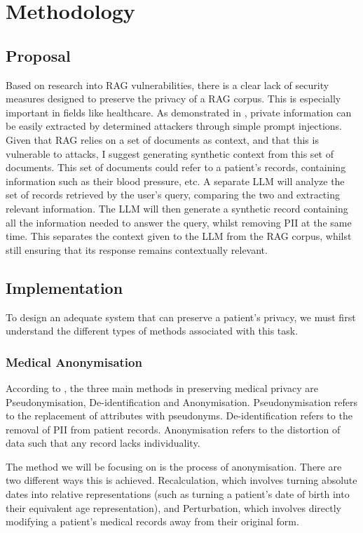 \chapter{Methodology}
\section{Proposal}
Based on research into RAG vulnerabilities, there is a clear lack of security measures designed to preserve the privacy of a RAG corpus. This is especially important in fields like healthcare.
As demonstrated in \autocite{zeng2024goodbadexploringprivacy}, private information can be easily extracted by determined attackers through simple prompt injections.
Given that RAG relies on a set of documents as context, and that this is vulnerable to attacks, I suggest generating synthetic context from this set of documents.
This set of documents could refer to a patient's records, containing information such as their blood pressure, etc.
A separate LLM will analyze the set of records retrieved by the user's query, comparing the two and extracting relevant information.
The LLM will then generate a synthetic record containing all the information needed to answer the query, whilst removing PII at the same time.
This separates the context given to the LLM from the RAG corpus, whilst still ensuring that its response remains contextually relevant.

\section {Implementation}
To design an adequate system that can preserve a patient's privacy, we must first understand the different types of methods associated with this task.

\subsection{Medical Anonymisation}
According to \autocite{Rodriguez_Tuck_Dozier_Lewis_Eldridge_Jackson_Murray_Weir_2022}, the three main methods in preserving medical privacy are Pseudonymisation, De-identification and Anonymisation.
Pseudonymisation refers to the replacement of attributes with pseudonyms. De-identification refers to the removal of PII from patient records.
Anonymisation refers to the distortion of data such that any record lacks individuality.

The method we will be focusing on is the process of anonymisation.
There are two different ways this is achieved.
Recalculation, which involves turning absolute dates into relative representations (such as turning a patient's date of birth into their equivalent age representation), and Perturbation, which involves directly modifying a patient's medical records away from their original form.

